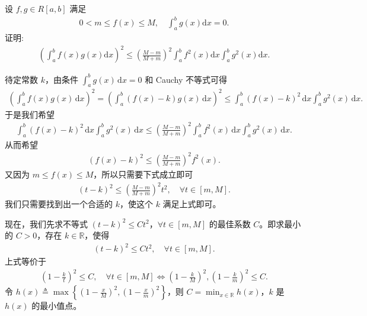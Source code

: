 \documentclass[../../main.tex]{subfiles}
\begin{document}
\begin{example}
设 \(f,g \in R[a,b]\) 满足
\begin{align*}
0 < m \leqslant f(x) \leqslant M, \quad \int_{a}^{b} g(x)\mathrm{d}x = 0.
\end{align*}
证明:
\begin{align*}
\left( \int_a^b{f\left( x \right) g\left( x \right) \mathrm{d}x} \right) ^2\leqslant \left( \frac{M-m}{M+m} \right) ^2\int_a^b{f^2\left( x \right) \mathrm{d}x\int_a^b{g^2\left( x \right) \mathrm{d}x.}}
\end{align*} 
\end{example}
\begin{remark}
待定常数 \(k\)，由条件 \(\int_a^b g(x) \, \mathrm{d}x = 0\) 和 Cauchy 不等式可得
\begin{align*}
\left( \int_a^b f(x) g(x) \, \mathrm{d}x \right)^2 = \left( \int_a^b \left( f(x) - k \right) g(x) \, \mathrm{d}x \right)^2 \leqslant \int_a^b \left( f(x) - k \right)^2 \, \mathrm{d}x \int_a^b g^2(x) \, \mathrm{d}x.
\end{align*}
于是我们希望
\begin{align*}
\int_a^b \left( f(x) - k \right)^2 \, \mathrm{d}x \int_a^b g^2(x) \, \mathrm{d}x \leqslant \left( \frac{M - m}{M + m} \right)^2 \int_a^b f^2(x) \, \mathrm{d}x \int_a^b g^2(x) \, \mathrm{d}x.
\end{align*}
从而希望
\begin{align*}
\left( f(x) - k \right)^2 \leqslant \left( \frac{M - m}{M + m} \right)^2 f^2(x).
\end{align*}
又因为 \(m \leqslant f(x) \leqslant M\)，所以只需要下式成立即可
\begin{align}
\left( t - k \right)^2 \leqslant \left( \frac{M - m}{M + m} \right)^2 t^2, \quad \forall t \in [m, M]. \label{eq:100.5}
\end{align}
我们只需要找到出一个合适的 \(k\)，使这个 \(k\) 满足上式即可。

现在，我们先求不等式 \(\left( t - k \right)^2 \leqslant C t^2\)，\(\forall t \in [m, M]\) 的最佳系数 \(C\)。即求最小的 \(C > 0\)，存在 \(k \in \mathbb{R}\)，使得
\begin{align*}
\left( t - k \right)^2 \leqslant C t^2, \quad \forall t \in [m, M].
\end{align*}
上式等价于
\begin{align*}
\left( 1 - \frac{k}{t} \right)^2 \leqslant C, \quad \forall t \in [m, M] \Longleftrightarrow \left( 1 - \frac{k}{M} \right)^2, \left( 1 - \frac{k}{m} \right)^2 \leqslant C.
\end{align*}
令 \(h(x) \triangleq \max \left\{ \left( 1 - \frac{x}{M} \right)^2, \left( 1 - \frac{x}{m} \right)^2 \right\}\)，则 \(C = \min_{x \in \mathbb{R}} h(x)\)，\(k\) 是 \(h(x)\) 的最小值点。


\end{remark}
\end{document}
